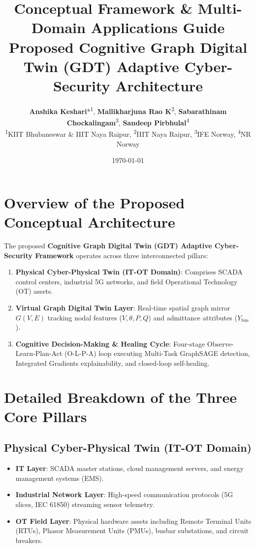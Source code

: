 \documentclass[11pt,a4paper]{article}
\title{\textbf{Conceptual Framework \& Multi-Domain Applications Guide}\\ \large Proposed Cognitive Graph Digital Twin (GDT) Adaptive Cyber-Security Architecture}
\author{\textbf{Anshika Keshari}*\textsuperscript{1}, \textbf{Mallikharjuna Rao K}\textsuperscript{2}, \textbf{Sabarathinam Chockalingam}\textsuperscript{3}, \textbf{Sandeep Pirbhulal}\textsuperscript{4} \\
\small \textsuperscript{1}KIIT Bhubaneswar \& IIIT Naya Raipur, \textsuperscript{2}IIIT Naya Raipur, \textsuperscript{3}IFE Norway, \textsuperscript{4}NR Norway}
\date{\today}
\begin{document}
\maketitle

\tableofcontents
\newpage

\section{Overview of the Proposed Conceptual Architecture}

The proposed \textbf{Cognitive Graph Digital Twin (GDT) Adaptive Cyber-Security Framework} operates across three interconnected pillars:

\begin{enumerate}
    \item \textbf{Physical Cyber-Physical Twin (IT-OT Domain)}: Comprises SCADA control centers, industrial 5G networks, and field Operational Technology (OT) assets.
    \item \textbf{Virtual Graph Digital Twin Layer}: Real-time spatial graph mirror $G(V, E)$ tracking nodal features ($V, \theta, P, Q$) and admittance attributes ($Y_{\text{bus}}$).
    \item \textbf{Cognitive Decision-Making \& Healing Cycle}: Four-stage Observe-Learn-Plan-Act (O-L-P-A) loop executing Multi-Task GraphSAGE detection, Integrated Gradients explainability, and closed-loop self-healing.
\end{enumerate}

\section{Detailed Breakdown of the Three Core Pillars}

\subsection{Physical Cyber-Physical Twin (IT-OT Domain)}
\begin{itemize}
    \item \textbf{IT Layer}: SCADA master stations, cloud management servers, and energy management systems (EMS).
    \item \textbf{Industrial Network Layer}: High-speed communication protocols (5G slices, IEC 61850) streaming sensor telemetry.
    \item \textbf{OT Field Layer}: Physical hardware assets including Remote Terminal Units (RTUs), Phasor Measurement Units (PMUs), busbar substations, and circuit breakers.
\end{itemize}
\end{document}

